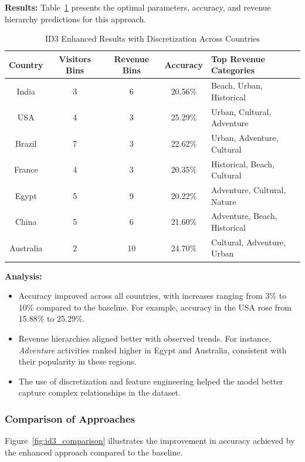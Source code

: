 \documentclass{article}
\begin{document}
\textbf{Results:} Table~\ref{tab:id3_discretization_results} presents the optimal parameters, accuracy, and revenue hierarchy predictions for this approach.

\begin{table}[h!]
    \centering
    \begin{tabular}{|c|c|c|c|l|}
        \hline
        \textbf{Country} & \textbf{Visitors Bins} & \textbf{Revenue Bins} & \textbf{Accuracy} & \textbf{Top Revenue Categories} \\ \hline
        India & 3 & 6 & 20.56\% & Beach, Urban, Historical \\
        USA & 4 & 3 & 25.29\% & Urban, Cultural, Adventure \\
        Brazil & 7 & 3 & 22.62\% & Urban, Adventure, Cultural \\
        France & 4 & 3 & 20.35\% & Historical, Beach, Cultural \\
        Egypt & 5 & 9 & 20.22\% & Adventure, Cultural, Nature \\
        China & 5 & 6 & 21.60\% & Adventure, Beach, Historical \\
        Australia & 2 & 10 & 24.70\% & Cultural, Adventure, Urban \\ \hline
    \end{tabular}
    \caption{ID3 Enhanced Results with Discretization Across Countries}
    \label{tab:id3_discretization_results}
\end{table}

\textbf{Analysis:}
\begin{itemize}
    \item Accuracy improved across all countries, with increases ranging from 3\% to 10\% compared to the baseline. For example, accuracy in the USA rose from 15.88\% to 25.29\%.
    \item Revenue hierarchies aligned better with observed trends. For instance, \textit{Adventure} activities ranked higher in Egypt and Australia, consistent with their popularity in these regions.
    \item The use of discretization and feature engineering helped the model better capture complex relationships in the dataset.
\end{itemize}

\subsubsection{Comparison of Approaches}
Figure~\ref{fig:id3_comparison} illustrates the improvement in accuracy achieved by the enhanced approach compared to the baseline.
\end{document}
